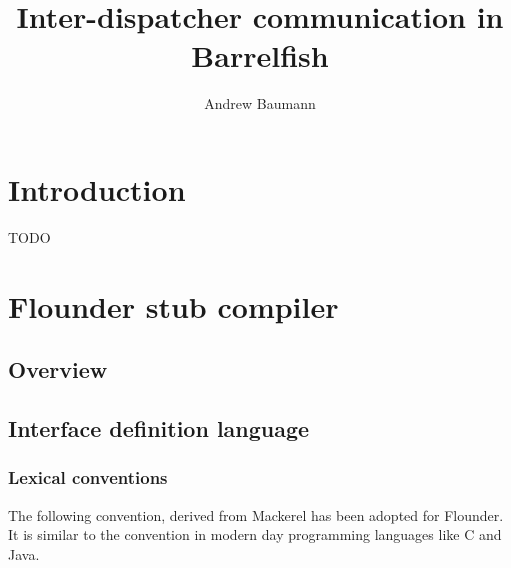 \documentclass[a4paper,twoside]{report} %
\title{Inter-dispatcher communication in Barrelfish}   %
\author{Andrew Baumann}	%
\begin{document}
\maketitle

%
%
\begin{versionhistory}
\end{versionhistory}



\newcommand{\note}[1]{[\textcolor{red}{\emph{#1}}]}

\tableofcontents

\chapter{Introduction}

TODO

\chapter{Flounder stub compiler}\label{cha:flounder}

\section{Overview}

\section{Interface definition language}\label{sec:idl}

\subsection{Lexical conventions}
The following convention, derived from Mackerel\cite{mackerel} has
been adopted for Flounder. It is similar to the convention in modern
day programming languages like C and Java.
\end{document}
